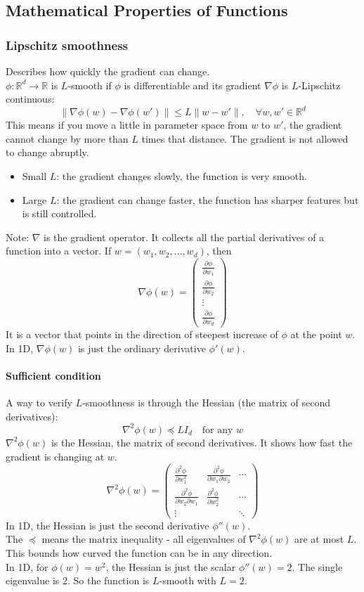 \documentclass[../Probability.tex]{subfiles}
\begin{document}
\subsection{Mathematical Properties of Functions}
\subsubsection{Lipschitz smoothness}
Describes how quickly the gradient can change.\\
$\phi: \mathbb{R}^d \to \mathbb{R}$ is $L$-smooth if $\phi$ is differentiable and its gradient $\nabla\phi$ is $L$-Lipschitz continuous:
$$\|\nabla\phi(w) - \nabla\phi(w')\| \leq L\|w - w'\|, \quad \forall w, w' \in \mathbb{R}^d$$
This means if you move a little in parameter space from $w$ to $w'$, the gradient cannot change by more than $L$ times that distance. The gradient is not allowed to change abruptly.
\begin{itemize}
    \item Small $L$: the gradient changes slowly, the function is very smooth.
    \item Large $L$: the gradient can change faster, the function has sharper features but is still controlled.
\end{itemize}
Note: $\nabla$ is the gradient operator. It collects all the partial derivatives of a function into a vector. If $w = (w_1, w_2, \ldots, w_d)$, then
$$\nabla\phi(w) = \begin{pmatrix} \frac{\partial\phi}{\partial w_1} \\ \frac{\partial\phi}{\partial w_2} \\ \vdots \\ \frac{\partial\phi}{\partial w_d} \end{pmatrix}$$
It is a vector that points in the direction of steepest increase of $\phi$ at the point $w$.
In 1D, $\nabla\phi(w)$ is just the ordinary derivative $\phi'(w)$.
\paragraph{Sufficient condition} A way to verify $L$-smoothness is through the Hessian (the matrix of second derivatives):
$$\nabla^2\phi(w) \preceq LI_d \quad \text{for any } w$$
$\nabla^2\phi(w)$ is the Hessian, the matrix of second derivatives. It shows how fast the gradient is changing at $w$.
$$\nabla^2\phi(w) = \begin{pmatrix} \frac{\partial^2\phi}{\partial w_1^2} & \frac{\partial^2\phi}{\partial w_1 \partial w_2} & \cdots \\ \frac{\partial^2\phi}{\partial w_2 \partial w_1} & \frac{\partial^2\phi}{\partial w_2^2} & \cdots \\ \vdots & & \ddots \end{pmatrix}$$
In 1D, the Hessian is just the second derivative $\phi''(w)$.\\
The $\preceq$ means the matrix inequality -  all eigenvalues of $\nabla^2\phi(w)$ are at most $L$. This bounds how curved the function can be in any direction.\\
In 1D, for $\phi(w)=w^2$, the Hessian is just the scalar $\phi''(w)=2$. The single eigenvalue is 2. So the function is $L$-smooth with $L=2$.
\end{document}
